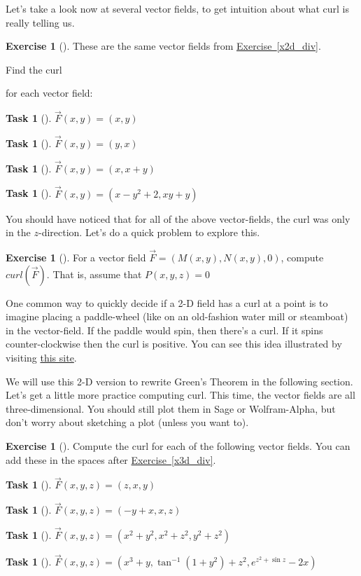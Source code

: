 \documentclass[10pt,]{book}
\theoremstyle{plain}
\theoremstyle{definition}
\theoremstyle{definition}
\theoremstyle{definition}
\theoremstyle{definition}
\newtheorem{exploration}[project]{Exercise}
\newtheorem{task}[project]{Task}
\theoremstyle{definition}
\numberwithin{equation}{section}
\begin{document}
Let's take a look now at several vector fields, to get intuition about what curl is really telling us.%
\begin{exploration}[]\label{x2dcurl}
These are the same vector fields from \hyperref[x2d_div]{Exercise~\ref{x2d_div}}.%
\par
Find the curl%
\par
for each vector field:%
\begin{task}[]\label{task-786}
\(\vec{F}(x,y)=(x,y)\)%
\end{task}
\begin{task}[]\label{task-787}
\(\vec{F}(x,y)=(y,x)\)%
\end{task}
\begin{task}[]\label{task-788}
\(\vec{F}(x,y)=(x,x+y)\)%
\end{task}
\begin{task}[]\label{task-789}
\(\vec{F}(x,y)=(x-y^2+2, xy+y)\)%
\end{task}
\end{exploration}
You should have noticed that for all of the above vector-fields, the curl was only in the \(z\)-direction. Let's do a quick problem to explore this.%
\begin{exploration}[]\label{show2dcurl}
For a vector field \(\vec{F}= ( M(x,y), N(x,y), 0 )\), compute \(curl( \vec{F})\). That is, assume that \(P(x,y,z)=0\)%
\end{exploration}
One common way to quickly decide if a 2-D field has a curl at a point is to imagine placing a paddle-wheel (like on an old-fashion water mill or steamboat) in the vector-field. If the paddle would spin, then there's a curl. If it spins counter-clockwise then the curl is positive. You can see this idea illustrated by visiting \href{http://www.math.harvard.edu/\~knill/pitf/2dcurldiv.html}{this site}.%
\par
We will use this 2-D version to rewrite Green's Theorem in the following section. Let's get a little more practice computing curl. This time, the vector fields are all three-dimensional. You should still plot them in Sage or Wolfram-Alpha, but don't worry about sketching a plot (unless you want to).%
\begin{exploration}[]\label{x3dcurl}
Compute the curl for each of the following vector fields. You can add these in the spaces after \hyperref[x3d_div]{Exercise~\ref{x3d_div}}.%
\begin{task}[]\label{task-790}
\(\vec F(x,y,z) = \left(z,x,y \right)\)%
\end{task}
\begin{task}[]\label{task-791}
\(\vec F(x,y,z) = \left(-y+x,x,z \right)\)%
\end{task}
\begin{task}[]\label{task-792}
\(\vec F(x,y,z) = \left(x^2+y^2,x^2+z^2,y^2+z^2 \right)\)%
\end{task}
\begin{task}[]\label{task-793}
\(\vec F(x,y,z) = \left(x^3+y,\tan^{-1}(1+y^2) + z^2,e^{z^2+\sin z} -2x\right)\)%
\end{task}
\end{exploration}
\typeout{************************************************}
\typeout{************************************************}
\end{document}
